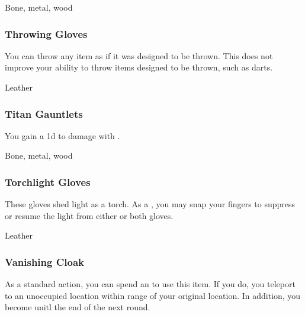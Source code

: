  


 Bone, metal, wood


\lowercase{\hypertarget{item:Throwing Gloves}{}}\label{item:Throwing Gloves}
\hypertarget{item:Throwing Gloves}{\subsubsection{Throwing Gloves\hfill{}}}

You can throw any item as if it was designed to be thrown.
This does not improve your ability to throw items designed to be thrown, such as darts.



 Leather


\lowercase{\hypertarget{item:Titan Gauntlets}{}}\label{item:Titan Gauntlets}
\hypertarget{item:Titan Gauntlets}{\subsubsection{Titan Gauntlets\hfill{}}}

You gain a \plus1d  to damage with .



 Bone, metal, wood


\lowercase{\hypertarget{item:Torchlight Gloves}{}}\label{item:Torchlight Gloves}
\hypertarget{item:Torchlight Gloves}{\subsubsection{Torchlight Gloves\hfill{}}}

These gloves shed light as a torch.
As a , you may snap your fingers to suppress or resume the light from either or both gloves.



 


 Leather


\lowercase{\hypertarget{item:Vanishing Cloak}{}}\label{item:Vanishing Cloak}
\hypertarget{item:Vanishing Cloak}{\subsubsection{Vanishing Cloak\hfill{}}}

As a standard action, you can spend an  to use this item.
If you do, you teleport to an unoccupied location within \rngmed range of your original location.
In addition, you become  unitl the end of the next round.

